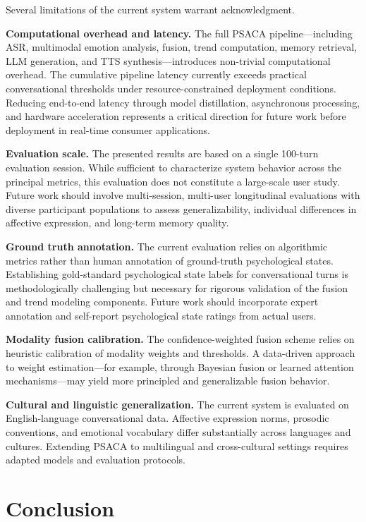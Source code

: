 \documentclass[conference]{IEEEtran}
\begin{document}
Several limitations of the current system warrant acknowledgment.

\textbf{Computational overhead and latency.} The full PSACA pipeline---including ASR, multimodal emotion analysis, fusion, trend computation, memory retrieval, LLM generation, and TTS synthesis---introduces non-trivial computational overhead. The cumulative pipeline latency currently exceeds practical conversational thresholds under resource-constrained deployment conditions. Reducing end-to-end latency through model distillation, asynchronous processing, and hardware acceleration represents a critical direction for future work before deployment in real-time consumer applications.

\textbf{Evaluation scale.} The presented results are based on a single 100-turn evaluation session. While sufficient to characterize system behavior across the principal metrics, this evaluation does not constitute a large-scale user study. Future work should involve multi-session, multi-user longitudinal evaluations with diverse participant populations to assess generalizability, individual differences in affective expression, and long-term memory quality.

\textbf{Ground truth annotation.} The current evaluation relies on algorithmic metrics rather than human annotation of ground-truth psychological states. Establishing gold-standard psychological state labels for conversational turns is methodologically challenging but necessary for rigorous validation of the fusion and trend modeling components. Future work should incorporate expert annotation and self-report psychological state ratings from actual users.

\textbf{Modality fusion calibration.} The confidence-weighted fusion scheme relies on heuristic calibration of modality weights and thresholds. A data-driven approach to weight estimation---for example, through Bayesian fusion or learned attention mechanisms---may yield more principled and generalizable fusion behavior.

\textbf{Cultural and linguistic generalization.} The current system is evaluated on English-language conversational data. Affective expression norms, prosodic conventions, and emotional vocabulary differ substantially across languages and cultures. Extending PSACA to multilingual and cross-cultural settings requires adapted models and evaluation protocols.

\section{Conclusion}
\label{sec:conclusion}
\end{document}

